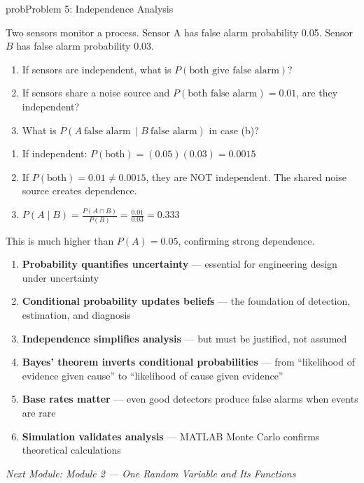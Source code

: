 \begin{PSbox}[unbreakable]{prob}{Problem 5: Independence Analysis}

Two sensors monitor a process. Sensor A has false alarm probability 0.05. Sensor $B$ has false alarm probability 0.03.

\begin{enumerate}
\def\labelenumi{(\alph{enumi})}
\tightlist
\item
  If sensors are independent, what is $P(\text{both give false alarm})$?
\item
  If sensors share a noise source and $P(\text{both false alarm}) = 0.01$, are they independent?
\item
  What is $P(A\ \text{false alarm}\ \mid B\ \text{false alarm})$ in case (b)?
\end{enumerate}

\PSsolution{} 

\begin{enumerate}
\def\labelenumi{(\alph{enumi})}
\item
  If independent: $P(\text{both}) = (0.05)(0.03) = 0.0015$
\item
  If $P(\text{both}) = 0.01 \ne 0.0015$, they are NOT independent. The shared noise source creates dependence.
\item
  $\displaystyle P(A \mid B) = \frac{P(A \cap B)}{P(B)} = \frac{0.01}{0.03} = 0.333$
\end{enumerate}

This is much higher than $P(A) = 0.05$, confirming strong dependence.

\end{PSbox}


\begin{enumerate}
\def\labelenumi{\arabic{enumi}.}
\tightlist
\item
  \textbf{Probability quantifies uncertainty} — essential for engineering design under uncertainty
\item
  \textbf{Conditional probability updates beliefs} — the foundation of detection, estimation, and diagnosis
\item
  \textbf{Independence simplifies analysis} — but must be justified, not assumed
\item
  \textbf{Bayes’ theorem inverts conditional probabilities} — from ``likelihood of evidence given cause'' to ``likelihood of cause given evidence''
\item
  \textbf{Base rates matter} — even good detectors produce false alarms when events are rare
\item
  \textbf{Simulation validates analysis} — MATLAB Monte Carlo confirms theoretical calculations
\end{enumerate}

\emph{Next Module: {Module 2 — One Random Variable and Its Functions}}
